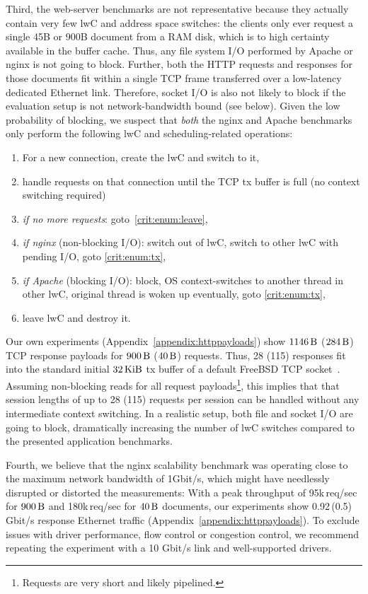\documentclass[10pt,twocolumn,a4paper]{article}
\begin{document}
Third, the web-server benchmarks are not representative because they actually contain very few lwC and address space switches:
the clients only ever request a single 45B or 900B document from a RAM disk, which is to high certainty available in the buffer cache.
Thus, any file system I/O performed by Apache or nginx is not going to block.
Further, both the HTTP requests and responses for those documents fit within a single TCP frame transferred over a low-latency dedicated Ethernet link.
Therefore, socket I/O is also not likely to block if the evaluation setup is not network-bandwidth bound (see below).
Given the low probability of blocking, we suspect that \textit{both} the nginx and Apache benchmarks only perform the following lwC and scheduling-related operations:
\begin{enumerate}[nosep]
\item For a new connection, create the lwC and switch to it,
\item\label{crit:enum:tx} handle requests on that connection until the TCP tx buffer is full (no context switching required)
\item \textit{if no more requests}: goto~\ref{crit:enum:leave},
\item \textit{if nginx} (non-blocking I/O): switch out of lwC, switch to other lwC with pending I/O, goto \ref{crit:enum:tx},
\item \textit{if Apache} (blocking I/O): block, OS context-switches to another thread in other lwC, original thread is woken up eventually, goto \ref{crit:enum:tx},
\item\label{crit:enum:leave} leave lwC and destroy it.
\end{enumerate}
Our own experiments (Appendix~\ref{appendix:httppayloads}) show $\SI{1146}{\byte}$ ($\SI{284}{\byte}$) TCP response payloads for $\SI{900}{\byte}$ ($\SI{40}{\byte}$) requests.
Thus, 28 (115) responses fit into the standard initial $\SI{32}{\kibi\byte}$ tx buffer of a default FreeBSD TCP socket~\cite{fbsd11tcpsendspace}.
Assuming non-blocking reads for all request payloads\footnote{Requests are very short and likely pipelined.}, this implies that that session lengths of up to 28 (115) requests per session can be handled without any intermediate context switching.
In a realistic setup, both file and socket I/O are going to block, dramatically increasing the number of lwC switches compared to the presented application benchmarks.

Fourth, we believe that the nginx scalability benchmark was operating close to the maximum network bandwidth of 1Gbit/s, which might have needlessly disrupted or distorted the measurements:
With a peak throughput of 95k\,req/sec for $\SI{900}{\byte}$ and 180k\,req/sec for $\SI{40}{\byte}$ documents, our experiments show 0.92\,(0.5)\,Gbit/s response Ethernet traffic (Appendix~\ref{appendix:httppayloads}).
To exclude issues with driver performance, flow control or congestion control, we recommend repeating the experiment with a 10 Gbit/s link and well-supported drivers.
\end{document}
